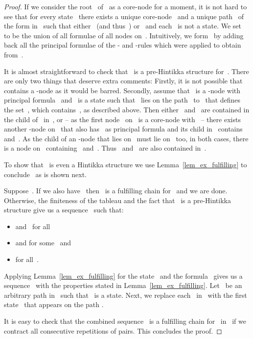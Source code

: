 \documentclass{entcs}
\newcommand{\trar}{}
\newcommand{\trert}{}
\begin{document}
\begin{center}
\begin{proof}
  If we consider the root~ of~ as a core-node for a moment,
  it is not hard to see that for every state~
  there exists a unique core-node~
  and a unique path~ of the form  in~
  such that either~ (and thus~)
  or~ and each~ is not a state.
  We set~ to be the union of all formulae of all nodes on~.
  Intuitively, we form~ by adding back all the principal formulae
  of the - and -rules
  which were applied to obtain~ from~.

  It is almost straightforward to check that~ is a pre-Hintikka structure for~.
  There are only two things that deserve extra comments:
  Firstly, it is not possible
  that~ contains a \trert{}-node as it would be barred.
  Secondly, assume that~ is a \trar{}-node with principal formula~
  and~ is a state such that~ lies on the path~ to~
  that defines the set~, which contains~, as described above.
  Then either~ and~ are contained in the child of~ in~,
  or -- as the first node~ on~ is a core-node with~ --
  there exists another \trar{}-node on~
  that also has~ as principal formula 
  and its child in~ contains~ and~.
  As the child of an -node that lies on~ must lie on~ too,
  in both cases, there is a node on~ containing~ and~.
  Thus~ and~ are also contained in~.

  To show that~ is even a Hintikka structure
  we use Lemma~\ref{lem_ex_fulfilling} to conclude~ as is shown next.

  Suppose~.
  If we also have~
  then~ is a fulfilling chain for~
  and we are done.
  Otherwise,
  the finiteness of the tableau
  and the fact that~ is a pre-Hintikka structure
  give us a sequence~
  such that:
  \begin{itemize}
  \item  and~ for all~
  \item  and  for some~ and~
  \item  for all~.
  \end{itemize}
  Applying Lemma~\ref{lem_ex_fulfilling} for the state~ and the formula~
  gives us a sequence~
  with the properties stated in Lemma~\ref{lem_ex_fulfilling}.
  Let~ be an arbitrary path in~ such that~ is a state.
  Next, we replace each~ in~ with the first state~
  that appears on the path .

  It is easy to check that the combined sequence~
  is a fulfilling chain for~ in~
  if we contract all consecutive repetitions of pairs.
  This concludes the proof.
\end{proof}


\end{center}
\end{document}
